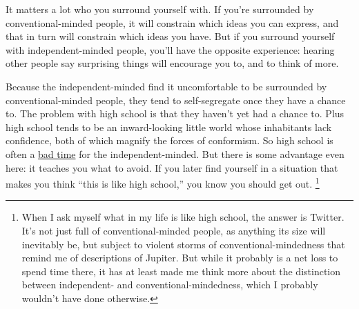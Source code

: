 It matters a lot who you surround yourself with. If you're surrounded by
conventional-minded people, it will constrain which ideas you can
express, and that in turn will constrain which ideas you have. But if
you surround yourself with independent-minded people, you'll have the
opposite experience: hearing other people say surprising things will
encourage you to, and to think of more.

Because the independent-minded find it uncomfortable to be surrounded by
conventional-minded people, they tend to self-segregate once they have a
chance to. The problem with high school is that they haven't yet had a
chance to. Plus high school tends to be an inward-looking little world
whose inhabitants lack confidence, both of which magnify the forces of
conformism. So high school is often a \href{nerds.html}{bad time} for
the independent-minded. But there is some advantage even here: it
teaches you what to avoid. If you later find yourself in a situation
that makes you think ``this is like high school,'' you know you should
get out. \footnote{When I ask myself what in my life is like high school, the
answer is Twitter. It's not just full of conventional-minded people, as
anything its size will inevitably be, but subject to violent storms of
conventional-mindedness that remind me of descriptions of Jupiter. But
while it probably is a net loss to spend time there, it has at least
made me think more about the distinction between independent- and
conventional-mindedness, which I probably wouldn't have done otherwise.}

